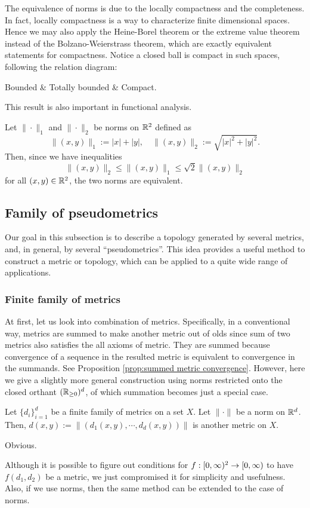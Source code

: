 \begin{rmk}
The equivalence of norms is due to the locally compactness and the completeness.
In fact, locally compactness is a way to characterize finite dimensional spaces.
Hence we may also apply the Heine-Borel theorem or the extreme value theorem instead of the Bolzano-Weierstrass theorem, which are exactly equivalent statements for compactness.
Notice a closed ball is compact in such spaces, following the relation diagram:
\begin{rd}[column sep=huge]
Bounded  & Totally bounded  & Compact.
\end{rd}
This result is also important in functional analysis.
\end{rmk}

\begin{ex}
Let $\|\cdot\|_1$ and $\|\cdot\|_2$ be norms on $\mathbb{R}^2$ defined as
\[\|(x,y)\|_1:=|x|+|y|,\quad\|(x,y)\|_2:=\sqrt{|x|^2+|y|^2}.\]
Then, since we have inequalities
\[\|(x,y)\|_2\le\|(x,y)\|_1\le\sqrt2\|(x,y)\|_2\]
for all $(x,y)\in\mathbb{R}^2$, the two norms are equivalent.
\end{ex}



\subsection{Family of pseudometrics}

Our goal in this subsection is to describe a topology generated by several metrics, and, in general, by several ``pseudometrics''.
This idea provides a useful method to construct a metric or topology, which can be applied to a quite wide range of applications.

\subsubsection{Finite family of metrics}
At first, let us look into combination of metrics.
Specifically, in a conventional way, metrics are summed to make another metric out of olds since sum of two metrics also satisfies the all axioms of metric.
They are summed because convergence of a sequence in the resulted metric is equivalent to convergence in the summands.
See Proposition \ref{prop:summed metric convergence}.
However, here we give a slightly more general construction using norms restricted onto the closed orthant $(\mathbb{R}_{\ge0})^d$, of which summation becomes just a special case.

\begin{prop}
Let $\{d_i\}_{i=1}^d$ be a finite family of metrics on a set $X$.
Let $\|\cdot\|$ be a norm on $\mathbb{R}^d$.
Then, $d(x,y):=\|(d_1(x,y),\cdots,d_d(x,y))\|$ is another metric on $X$.
\end{prop}
\begin{pf}
Obvious.
\end{pf}
\begin{rmk}
Although it is possible to figure out conditions for $f:[0,\oo)^2\to[0,\oo)$ to have $f(d_1,d_2)$ be a metric, we just compromised it for simplicity and usefulness.
Also, if we use norms, then the same method can be extended to the case of norms.
\end{rmk}

